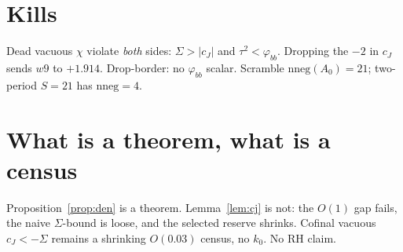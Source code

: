 \documentclass[11pt]{article}
\theoremstyle{remark}
\newcommand{\phibb}{\varphi_{bb}}
\begin{document}
\section{Kills}\label{sec:kills}

Dead vacuous $\chi$ violate \emph{both} sides:
$\Sigma>|c_J|$ and $\tau^{2}<\phibb$.
Dropping the $-2$ in $c_J$ sends $w9$ to $+1.914$.
Drop-border: no $\phibb$ scalar.
Scramble $\mathrm{nneg}(A_{0})=21$; two-period $S=21$
has $\mathrm{nneg}=4$.

\section{What is a theorem, what is a census}\label{sec:honest}

Proposition~\ref{prop:den} is a theorem.
Lemma~\ref{lem:cj} is not: the $O(1)$ gap fails, the
naive $\Sigma$-bound is loose, and the selected reserve
shrinks.
Cofinal vacuous $c_J<-\Sigma$ remains a shrinking
$O(0.03)$ census, no $k_{0}$.
No RH claim.
\end{document}
